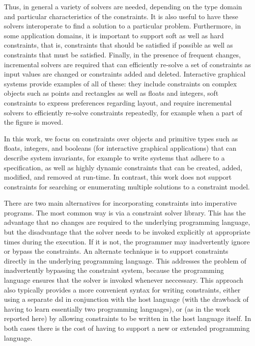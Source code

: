 Thus, in general a variety of solvers are
needed, depending on the type domain and particular characteristics of
the constraints.  It is also useful to have these solvers interoperate
to find a solution to a particular problem. Furthermore, in some
application domains, it is important to support soft as well as hard
constraints, that is, constraints that should be satisfied if possible
as well as constraints that must be satisfied. Finally, in the presence of
frequent changes, incremental solvers are required that can efficiently
re-solve a set of constraints as input values are changed or
constraints added and deleted.  Interactive graphical systems provide
examples of all of these: they include constraints on complex objects
such as points and rectangles as well as floats and integers, soft
constraints to express preferences regarding layout, and require
incremental solvers to efficiently re-solve constraints repeatedly,
for example when a part of the figure is moved.

In this work, we focus on constraints over objects and primitive types
such as floats, integers, and booleans (\eg for interactive graphical
applications) that can describe system invariants, for example to
write systems that adhere to a specification, as well as highly
dynamic constraints that can be created, added, modified, and removed
at run-time. In contrast, this work does not support constraints for
searching or enumerating multiple solutions to a constraint model.

There are two main alternatives for incorporating constraints into
imperative programs. The most common way is via a constraint solver
library.  This has the advantage that no changes are required to the
underlying programming language, but the disadvantage that the solver
needs to be invoked explicitly at appropriate times during the
execution. If it is not, the programmer may inadvertently ignore or
bypass the constraints.  An alternate technique is to support
constraints directly in the underlying programming language.  This
addresses the problem of inadvertently bypassing the constraint
system, because the programming language ensures that the solver is
invoked whenever neccessary. This approach also typically provides a
more convenient syntax for writing constraints, either using a
separate \ac{dsl} in conjunction with the host language (with the
drawback of having to learn essentially two programming languages), or
(as in the work reported here) by allowing constraints to be written
in the host language itself.  In both cases there is the cost of
having to support a new or extended programming language.

